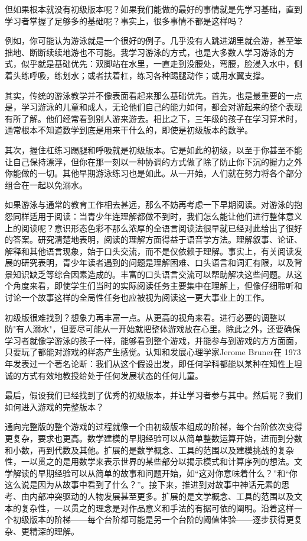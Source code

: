 但如果根本就没有初级版本呢？如果我们能做的最好的事情就是先学习基础，直到学习者掌握了足够多的基础呢？事实上，很多事情不都是这样吗？

例如，你可能认为游泳就是一个很好的例子。几乎没有人跳进湖里就会游，甚至笨拙地、断断续续地游也不可能。我学习游泳的方式，也是大多数人学习游泳的方式，似乎就是基础优先：双脚站在水里，一直走到没腰处，弯腰，脸浸入水中，侧着头练呼吸，练划水；或者扶着杠，练习各种踢腿动作；或用水翼支撑。

其实，传统的游泳教学并不像表面看起来那么基础优先。首先，也是最重要的一点是，学习游泳的儿童和成人，无论他们自己的能力如何，都会对游起来的整个表现有所了解。他们经常看到别人游来游去。相比之下，三年级的孩子在学习算术时，通常根本不知道数学到底是用来干什么的，即使是初级版本的数学。

其次，握住杠练习踢腿和呼吸就是初级版本。它是如此的初级，以至于你甚至不能让自己保持漂浮，但你在那一刻以一种协调的方式做了除了防止你下沉的握力之外你能做的一切。其他早期游泳练习也是如此。从一开始，人们就在努力将各个部分组合在一起以免溺水。

如果游泳与通常的教育工作相去甚远，那么不妨再考虑一下早期阅读。对游泳的抱怨同样适用于阅读：当青少年连理解都做不到时，我们怎么能让他们进行整体意义上的阅读呢？意识形态色彩不那么浓厚的全语言阅读法很早就已经对此给出了很好的答案。研究清楚地表明，阅读的理解方面得益于语音学方法。理解叙事、论证、解释和其他语言现象，始于口头交流，而不是仅依赖于理解。事实上，有关阅读发展的研究表明，青少年读者遇到的问题是理解困难、口头语言和词汇有限，以及背景知识缺乏等综合因素造成的。丰富的口头语言交流可以帮助解决这些问题。从这个角度来看，即使学生们当时的实际阅读任务主要集中在理解上，但像仔细聆听和讨论一个故事这样的全局性任务也应被视为阅读这一更大事业上的工作。

初级版很难找到？想象力再丰富一点。从更高的视角来看。进行必要的调整以防"有人溺水"，但要尽可能从一开始就把整体游戏放在心里。除此之外，还要确保学习者就像学游泳的孩子一样，能够看到整个游戏，并能参与到游戏的方方面面，只要玩了都能对游戏的样态产生感觉。认知和发展心理学家Jerome Bruner在 1973年发表过一个著名论断：我们从这个假设出发，即任何学科都能以某种在知性上坦诚的方式有效地教授给处于任何发展状态的任何儿童。

最后，假设我们已经找到了优秀的初级版本，并让学习者参与其中。然后呢？我们如何进入游戏的完整版本？

通向完整版的整个游戏的过程就像一个由初级版本组成的阶梯，每个台阶依次变得更复杂，要求也更高。数学建模的早期经验可以从简单整数运算开始，进而到分数和小数，再到代数及其他。扩展的是数学概念、工具的范围以及建模挑战的复杂性，一以贯之的是用数学来表示世界的某些部分以揭示模式和计算序列的想法。文学解读的早期经验可以从简单的故事和问题开始，如“这对你意味着什么？”和“你这么说是因为从故事中看到了什么？”。接下来，推进到对故事中神话元素的思考、由内部冲突驱动的人物发展甚至更多。扩展的是文学概念、工具的范围以及文本的复杂性，一以贯之的理念是对作品意义和手法的有据可依的阐明。沿着这样一个初级版本的阶梯——每个台阶都可能是另一个台阶的阈值体验——逐步获得更复杂、更精深的理解。

